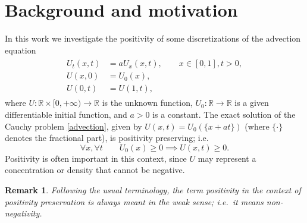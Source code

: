 \documentclass[a4paper]{article}
\newtheorem{remark}{Remark}
\begin{document}
\section{Background and motivation}
In this work we investigate the positivity of some discretizations of the advection equation
\begin{align}\label{advection}
\begin{split}
	U_t (x,t) &= a U_x(x,t), \qquad x\in[0,1], t>0, \\
	U(x,0) &= U_0(x), \\
	U(0,t) &= U(1,t),
\end{split}
\end{align}
where $U:\mathbb{R}\times [0,+\infty)\to\mathbb{R}$ is the unknown function, $U_0:\mathbb{R}\to\mathbb{R}$ is a given differentiable initial function, and $a>0$ is a constant. 
The exact solution of the Cauchy problem \eqref{advection}, given by $U(x,t) =
U_0(\{x+a t\})$ (where $\{\cdot\}$ denotes the fractional part), is positivity preserving; i.e.
\[
\forall x, \forall t\quad\quad U_0(x) \ge 0 \implies U(x,t) \ge 0.
\]
Positivity is often important in this context, since $U$ may represent a
concentration or density that cannot be negative.

\begin{remark}
Following the usual terminology, the term {\emph{positivity}} in the context of {positivity preservation} is always meant in the weak sense; i.e.~it means {\emph{non-negativity}}. 
\end{remark}

\\
\\
\\
\\
\\
\\
\end{document}
